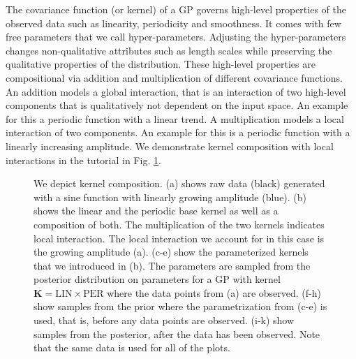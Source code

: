 The covariance function (or kernel) of a \ac{GP} governs high-level properties of the observed data such as linearity, periodicity and smoothness.
It comes with few free parameters that we call hyper-parameters.
Adjusting the hyper-parameters changes non-qualitative attributes such as length
scales while preserving the qualitative properties of the distribution.
These high-level properties are compositional via addition and multiplication of different covariance functions. An addition models a global interaction, that is an interaction of two high-level components that is qualitatively not dependent on the input space. An example for this a periodic function with a linear trend.
A multiplication models a local interaction of two components. 
An example for this is a periodic function with a linearly increasing amplitude. We demonstrate kernel composition with local interactions in the tutorial in Fig. \ref{fig:composition_tutorial}. 


\begin{figure}

\caption{We depict kernel composition. 
(a) shows raw data (black) generated with a sine function with linearly growing amplitude (blue). 
(b) shows the linear and the periodic base kernel as well as a composition of both. 
The multiplication of the two kernels indicates local interaction. The local interaction we account for in this case is the growing amplitude (a). (c-e) show the parameterized kernels that we introduced in (b).
The parameters are sampled from the posterior distribution on parameters for a \ac{GP} with kernel $\mathbf{K}=\text{LIN} \times \text{PER}$ where the data points from (a) are observed.
(f-h) show samples from the prior where the parametrization from (c-e) is used, that is, before any data points are observed.
(i-k) show samples from the posterior, after the data has been observed. Note that the same data is used for all of the plots.}
\label{fig:composition_tutorial}
\end{figure}





